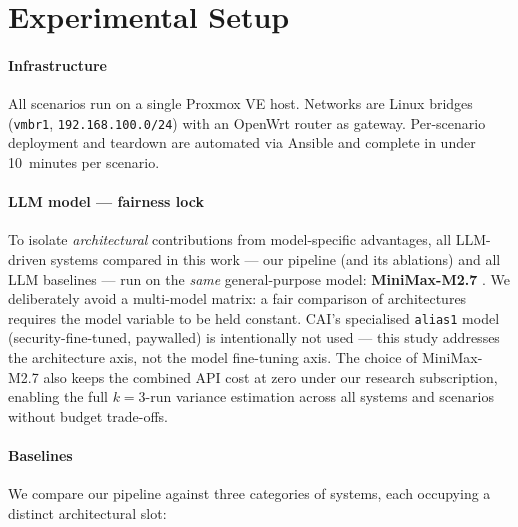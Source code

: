 
\section{Experimental Setup}
\label{sec:setup}

\paragraph{Infrastructure}
All scenarios run on a single Proxmox VE host. Networks are Linux bridges
(\texttt{vmbr1}, \texttt{192.168.100.0/24}) with an OpenWrt router as gateway.
Per-scenario deployment and teardown are automated via Ansible and complete
in under 10~minutes per scenario.

\paragraph{LLM model — fairness lock}
To isolate \emph{architectural} contributions from model-specific advantages, all
LLM-driven systems compared in this work --- our pipeline (and its ablations) and
all LLM baselines --- run on the \emph{same} general-purpose model:
\textbf{MiniMax-M2.7} \cite{minimax27}. We deliberately avoid a multi-model
matrix: a fair comparison of architectures requires the model variable to be
held constant. CAI's specialised \texttt{alias1} model (security-fine-tuned,
paywalled) is intentionally not used --- this study addresses the architecture
axis, not the model fine-tuning axis. The choice of MiniMax-M2.7 also keeps the
combined API cost at zero under our research subscription, enabling the full
$k{=}3$-run variance estimation across all systems and scenarios without budget
trade-offs.

\paragraph{Baselines}
We compare our pipeline against three categories of systems, each occupying a
distinct architectural slot:

